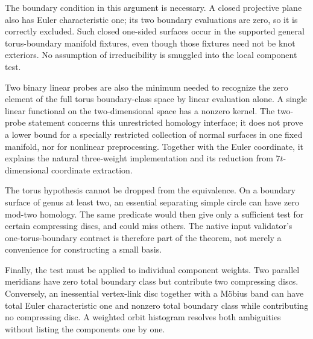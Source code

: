The boundary condition in this argument is necessary. A closed projective
plane also has Euler characteristic one; its two boundary evaluations are
zero, so it is correctly excluded. Such closed one-sided surfaces occur in
the supported general torus-boundary manifold fixtures, even though those
fixtures need not be knot exteriors. No assumption of irreducibility is
smuggled into the local component test.

Two binary linear probes are also the minimum needed to recognize the zero
element of the full torus boundary-class space by linear evaluation alone.
A single linear functional on the two-dimensional space has a nonzero
kernel. The two-probe statement concerns this unrestricted homology interface;
it does not prove a lower bound for a specially restricted collection of
normal surfaces in one fixed manifold, nor for nonlinear preprocessing.
Together with the Euler coordinate, it explains the natural three-weight
implementation and its reduction from $7t$-dimensional coordinate extraction.

The torus hypothesis cannot be dropped from the equivalence. On a boundary
surface of genus at least two, an essential separating simple circle can have
zero mod-two homology. The same predicate would then give only a sufficient
test for certain compressing discs, and could miss others. The native input
validator's one-torus-boundary contract is therefore part of the theorem,
not merely a convenience for constructing a small basis.

Finally, the test must be applied to individual component weights. Two
parallel meridians have zero total boundary class but contribute two
compressing discs. Conversely, an inessential vertex-link disc together with
a M\"obius band can have total Euler characteristic one and nonzero total
boundary class while contributing no compressing disc. A weighted orbit
histogram resolves both ambiguities without listing the components one by one.
